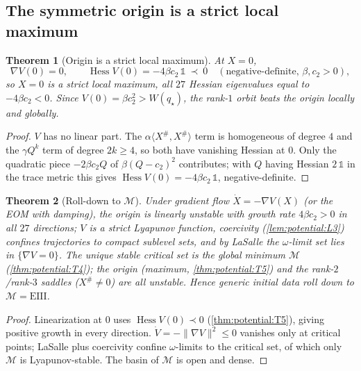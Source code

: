 \documentclass[11pt]{article}
\theoremstyle{plain}
\newtheorem{theorem}{Theorem}[section]
\theoremstyle{definition}
\theoremstyle{remark}
\begin{document}
\subsection{The symmetric origin is a strict local maximum}
\label{sec:potential:origin}

\begin{theorem}[Origin is a strict local maximum]
\label{thm:potential:T5}
\label{thm:pot:HessOrigin}
At $X=0$,
\begin{equation}
\label{eq:potential:hess0}
\nabla V(0)=0,\qquad
\operatorname{Hess}V(0)=-4\beta c_2\,\mathbb 1\ \prec\ 0
\quad(\text{negative-definite, }\beta,c_2>0),
\end{equation}
so $X=0$ is a strict local maximum, all $27$ Hessian eigenvalues equal to $-4\beta c_2<0$.
Since $V(0)=\beta c_2^2>W(q_\star)$, the rank-$1$ orbit beats the origin locally and globally.
\end{theorem}

\begin{proof}
$V$ has no linear part. The $\alpha\langle X^\#,X^\#\rangle$ term is homogeneous of degree $4$
and the $\gamma Q^k$ term of degree $2k\ge4$, so both have vanishing Hessian at $0$. Only the
quadratic piece $-2\beta c_2 Q$ of $\beta(Q-c_2)^2$ contributes; with $Q$ having Hessian
$2\,\mathbb 1$ in the trace metric this gives $\operatorname{Hess}V(0)=-4\beta c_2\,\mathbb 1$,
negative-definite.
\end{proof}

\begin{theorem}[Roll-down to $\mathcal M$]
\label{thm:potential:T6}
Under gradient flow $\dot X=-\nabla V(X)$ (or the EOM with damping), the origin is linearly
unstable with growth rate $4\beta c_2>0$ in all $27$ directions; $V$ is a strict Lyapunov
function, coercivity (\autoref{lem:potential:L3}) confines trajectories to compact sublevel
sets, and by LaSalle the $\omega$-limit set lies in $\{\nabla V=0\}$. The unique stable
critical set is the global minimum $\mathcal M$ (\autoref{thm:potential:T4}); the origin
(maximum, \autoref{thm:potential:T5}) and the rank-$2$/rank-$3$ saddles ($X^\#\neq0$) are all
unstable. Hence generic initial data roll down to $\mathcal M=\mathrm{EIII}$.
\end{theorem}

\begin{proof}
Linearization at $0$ uses $\operatorname{Hess}V(0)\prec0$ (\autoref{thm:potential:T5}), giving
positive growth in every direction. $\dot V=-\|\nabla V\|^2\le0$ vanishes only at critical
points; LaSalle plus coercivity confine $\omega$-limits to the critical set, of which only
$\mathcal M$ is Lyapunov-stable. The basin of $\mathcal M$ is open and dense.
\end{proof}
\end{document}
